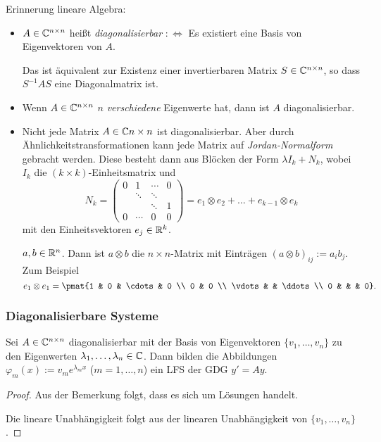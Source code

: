 Erinnerung lineare Algebra:
\begin{itemize}
  \item $A \in \mathbb{C}^{n \times n}$ heißt \emph{diagonalisierbar}
    $:\Leftrightarrow$ Es existiert eine Basis von Eigenvektoren von $A$.

    Das ist äquivalent zur Existenz einer invertierbaren Matrix $S \in
    \mathbb{C}^{n \times n}$, so dass $S^{-1} A S$ eine Diagonalmatrix ist.
  \item Wenn $A \in \mathbb{C}^{n \times n}$ $n$ \emph{verschiedene} Eigenwerte
    hat, dann ist $A$ diagonalisierbar.
  \item Nicht jede Matrix $A \in \mathbb{C}{n \times n}$ ist diagonalisierbar.
    Aber durch Ähnlichkeits\-trans\-for\-mationen kann jede Matrix auf
    \emph{Jordan-Normalform} gebracht werden. Diese besteht dann aus Blöcken der
    Form $\lambda I_k + N_k$, wobei $I_k$ die $(k \times k)$-Einheitsmatrix und
    \[ N_k =
      \begin{pmatrix}
        0 & 1 & \cdots & 0 \\
        & \ddots & \ddots \\
        & & \ddots & 1 \\
        0 & \cdots & 0 & 0
      \end{pmatrix}
      = e_1 \otimes e_2 + \ldots + e_{k-1} \otimes e_k \]
    mit den Einheitsvektoren $e_j \in \mathbb{R}^k$.

    $a,b \in \mathbb{R}^n$. Dann ist $a \otimes b$ die $n \times n$-Matrix mit
    Einträgen $(a \otimes b)_{ij} := a_i b_j$. Zum Beispiel
    \[ e_1 \otimes e_1 = \pmat{1 & 0  & \cdots & 0 \\ 0 & 0 \\ \vdots & & \ddots
        \\ 0 & & & 0}. \]
\end{itemize}

\subsubsection*{Diagonalisierbare Systeme}
\begin{thm}
  Sei $A \in \mathbb{C}^{n \times n}$ diagonalisierbar mit der Basis von
  Eigenvektoren $\{ v_1, \ldots, v_n \}$ zu den Eigenwerten $\lambda_1, \ldots,
  \lambda_n \in \mathbb{C}$. Dann bilden die Abbildungen $\varphi_m(x) := v_m
  e^{\lambda_m x}$ ($m=1,\ldots,n$) ein LFS der GDG $y' = Ay$.
\end{thm}

\begin{proof}
Aus der Bemerkung folgt, dass es sich um Lösungen handelt.

Die lineare Unabhängigkeit folgt aus der linearen Unabhängigkeit von $\{ v_1,
\ldots, v_n \}$.
\end{proof}

